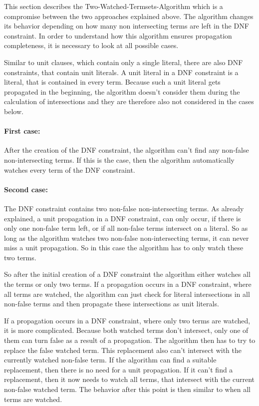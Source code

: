 This section describes the Two-Watched-Termsets-Algorithm which is a compromise between the two approaches explained above. The algorithm changes its behavior depending on how many non intersecting terms are left in the DNF constraint. In order to understand how this algorithm ensures propagation completeness, it is necessary to look at all possible cases.

Similar to unit clauses, which contain only a single literal, there are also DNF constraints, that contain unit literals. A unit literal in a DNF constraint is a literal, that is contained in every term.
Because such a unit literal gets propagated in the beginning, the algorithm doesn't consider them during the calculation of intersections and they are therefore also not considered in the cases below.


\paragraph{First case:} After the creation of the DNF constraint, the algorithm can't find any non-false non-intersecting terms. If this is the case, then the algorithm automatically watches every term of the DNF constraint.

\paragraph{Second case:} The DNF constraint contains two non-false non-intersecting terms. As already explained, a unit propagation in a DNF constraint, can only occur, if there is only one non-false term left, or if all non-false terms intersect on a literal. So as long as the algorithm watches two non-false non-intersecting terms, it can never miss a unit propagation. So in this case the algorithm has to only watch these two terms.

So after the initial creation of a DNF constraint the algorithm either watches all the terms or only two terms. If a propagation occurs in a DNF constraint, where all terms are watched, the algorithm can just check for literal intersections in all non-false terms and then propagate these intersections as unit literals.

If a propagation occurs in a DNF constraint, where only two terms are watched, it is more complicated. Because both watched terms don't intersect, only one of them can turn false as a result of a propagation. The algorithm then has to try to replace the false watched term. This replacement also can't intersect with the currently watched non-false term. If the algorithm can find a suitable replacement, then there is no need for a unit propagation. If it can't find a replacement, then it now needs to watch all terms, that intersect with the current non-false watched term. The behavior after this point is then similar to when all terms are watched.

